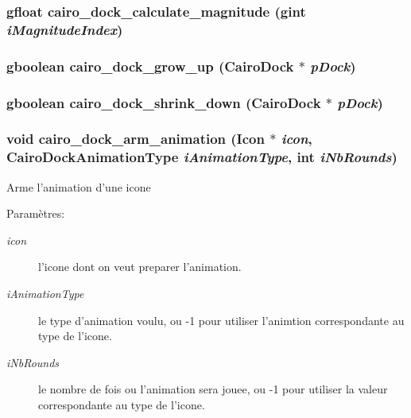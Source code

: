 \subsubsection{\setlength{\rightskip}{0pt plus 5cm}gfloat cairo\_\-dock\_\-calculate\_\-magnitude (gint {\em iMagnitudeIndex})}\label{cairo-dock-animations_8h_9e998350ee650b466b278b892f8e6d98}


\subsubsection{\setlength{\rightskip}{0pt plus 5cm}gboolean cairo\_\-dock\_\-grow\_\-up ({\bf CairoDock} $\ast$ {\em pDock})}\label{cairo-dock-animations_8h_5f6835106b72e260624d5f09db86a6bf}


\subsubsection{\setlength{\rightskip}{0pt plus 5cm}gboolean cairo\_\-dock\_\-shrink\_\-down ({\bf CairoDock} $\ast$ {\em pDock})}\label{cairo-dock-animations_8h_9c19b3db8ce61a2e377cbd66aff22ee3}


\subsubsection{\setlength{\rightskip}{0pt plus 5cm}void cairo\_\-dock\_\-arm\_\-animation ({\bf Icon} $\ast$ {\em icon}, {\bf CairoDockAnimationType} {\em iAnimationType}, int {\em iNbRounds})}\label{cairo-dock-animations_8h_2341802d978d04a570615adb01e1046f}


Arme l'animation d'une icone \begin{Desc}
\item[Paramètres:]
\begin{description}
\item[{\em icon}]l'icone dont on veut preparer l'animation. \item[{\em iAnimationType}]le type d'animation voulu, ou -1 pour utiliser l'animtion correspondante au type de l'icone. \item[{\em iNbRounds}]le nombre de fois ou l'animation sera jouee, ou -1 pour utiliser la valeur correspondante au type de l'icone. \end{description}
\end{Desc}
